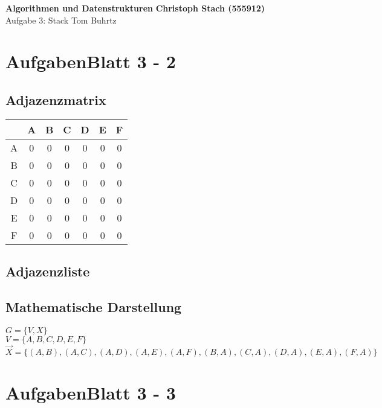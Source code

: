 \documentclass[a4paper, 11pt]{article}
\begin{document}
\noindent
\large\textbf{Algorithmen und Datenstrukturen} \hfill \textbf{Christoph Stach (555912)} \\
\normalsize Aufgabe 3: Stack \hfill Tom Buhrtz \\

\section*{AufgabenBlatt 3 - 2}

\subsection*{Adjazenzmatrix}
\begin{tabular}{ |c|c|c|c|c|c|c| }
\hline
  & A & B & C & D & E & F \\
\hline
A & 0 & 0 & 0 & 0 & 0 & 0 \\
\hline
B & 0 & 0 & 0 & 0 & 0 & 0 \\
\hline
C & 0 & 0 & 0 & 0 & 0 & 0 \\
\hline
D & 0 & 0 & 0 & 0 & 0 & 0 \\
\hline
E & 0 & 0 & 0 & 0 & 0 & 0 \\
\hline
F & 0 & 0 & 0 & 0 & 0 & 0 \\
\hline
\end{tabular}

\subsection*{Adjazenzliste}


\subsection*{Mathematische Darstellung}
\( G = \{ V , X \} \) \\
\( V = \{ A , B , C , D , E , F \} \)  \\
\( \vec X = \{ (A,B) , (A,C) , (A,D) , (A,E) , (A,F) , (B,A) , (C,A) , (D,A) , (E,A) , (F,A) \} \)

\pagebreak

\section*{AufgabenBlatt 3 - 3}





\end{document}
